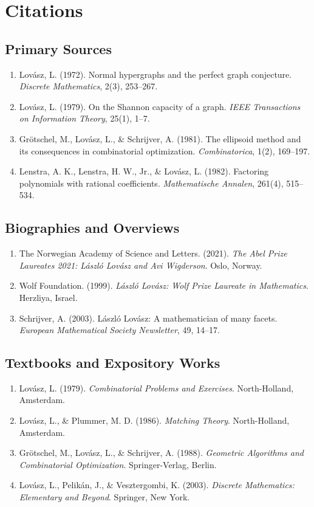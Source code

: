 \section{Citations}

\subsection*{Primary Sources}
\begin{enumerate}
    \item Lovász, L. (1972). Normal hypergraphs and the perfect graph conjecture. \textit{Discrete Mathematics}, 2(3), 253--267.
    \item Lovász, L. (1979). On the Shannon capacity of a graph. \textit{IEEE Transactions on Information Theory}, 25(1), 1--7.
    \item Grötschel, M., Lovász, L., \& Schrijver, A. (1981). The ellipsoid method and its consequences in combinatorial optimization. \textit{Combinatorica}, 1(2), 169--197.
    \item Lenstra, A. K., Lenstra, H. W., Jr., \& Lovász, L. (1982). Factoring polynomials with rational coefficients. \textit{Mathematische Annalen}, 261(4), 515--534.
\end{enumerate}

\subsection*{Biographies and Overviews}
\begin{enumerate}
    \item The Norwegian Academy of Science and Letters. (2021). \textit{The Abel Prize Laureates 2021: László Lovász and Avi Wigderson}. Oslo, Norway.
    \item Wolf Foundation. (1999). \textit{László Lovász: Wolf Prize Laureate in Mathematics}. Herzliya, Israel.
    \item Schrijver, A. (2003). László Lovász: A mathematician of many facets. \textit{European Mathematical Society Newsletter}, 49, 14--17.
\end{enumerate}

\subsection*{Textbooks and Expository Works}
\begin{enumerate}
    \item Lovász, L. (1979). \textit{Combinatorial Problems and Exercises}. North-Holland, Amsterdam.
    \item Lovász, L., \& Plummer, M. D. (1986). \textit{Matching Theory}. North-Holland, Amsterdam.
    \item Grötschel, M., Lovász, L., \& Schrijver, A. (1988). \textit{Geometric Algorithms and Combinatorial Optimization}. Springer-Verlag, Berlin.
    \item Lovász, L., Pelikán, J., \& Vesztergombi, K. (2003). \textit{Discrete Mathematics: Elementary and Beyond}. Springer, New York.
\end{enumerate}
